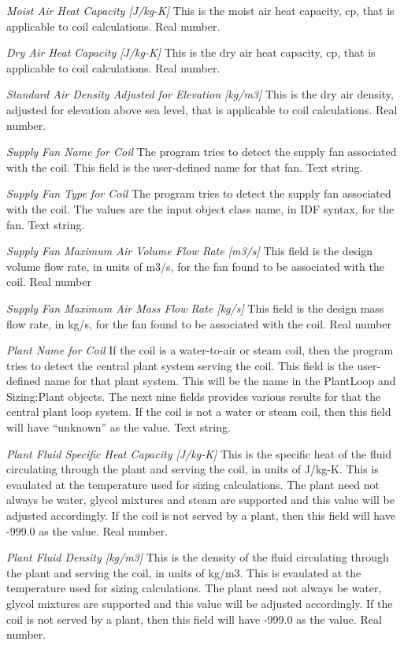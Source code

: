 \emph{Moist Air Heat Capacity [J/kg-K]}  This is the moist air heat capacity, cp, that is applicable to coil calculations. Real number.

\emph{Dry Air Heat Capacity [J/kg-K]}  This is the dry air heat capacity, cp, that is applicable to coil calculations. Real number.

\emph{Standard Air Density Adjusted for Elevation [kg/m3]}  This is the dry air density, adjusted for elevation above sea level, that is applicable to coil calculations. Real number.

\emph{Supply Fan Name for Coil} The program tries to detect the supply fan associated with the coil.  This field is the user-defined name for that fan. Text string.

\emph{Supply Fan Type for Coil} The program tries to detect the supply fan associated with the coil. The values are the input object class name, in IDF syntax, for the fan.  Text string.

\emph{Supply Fan Maximum Air Volume Flow Rate [m3/s]}  This field is the design volume flow rate, in units of m3/s, for the fan found to be associated with the coil.  Real number

\emph{Supply Fan Maximum Air Mass Flow Rate [kg/s]} This field is the design mass flow rate, in kg/s, for the fan found to be associated with the coil. Real number

\emph{Plant Name for Coil} If the coil is a water-to-air or steam coil, then the program tries to detect the central plant system serving the coil. This field is the user-defined name for that plant system.  This will be the name in the PlantLoop and Sizing:Plant objects.  The next nine fields provides various results for that the central plant loop system.  If the coil is not a water or steam coil, then this field will have ``unknown'' as the value.  Text string.

\emph{Plant Fluid Specific Heat Capacity [J/kg-K]}  This is the specific heat of the fluid circulating through the plant and serving the coil, in units of J/kg-K.  This is evaulated at the temperature used for sizing calculations. The plant need not always be water, glycol mixtures and steam are supported and this value will be adjusted accordingly.  If the coil is not served by a plant, then this field will have -999.0 as the value. Real number.

\emph{Plant Fluid Density [kg/m3]} This is the density of the fluid circulating through the plant and serving the coil, in units of kg/m3.  This is evaulated at the temperature used for sizing calculations. The plant need not always be water, glycol mixtures are supported and this value will be adjusted accordingly.  If the coil is not served by a plant, then this field will have -999.0 as the value.  Real number.

